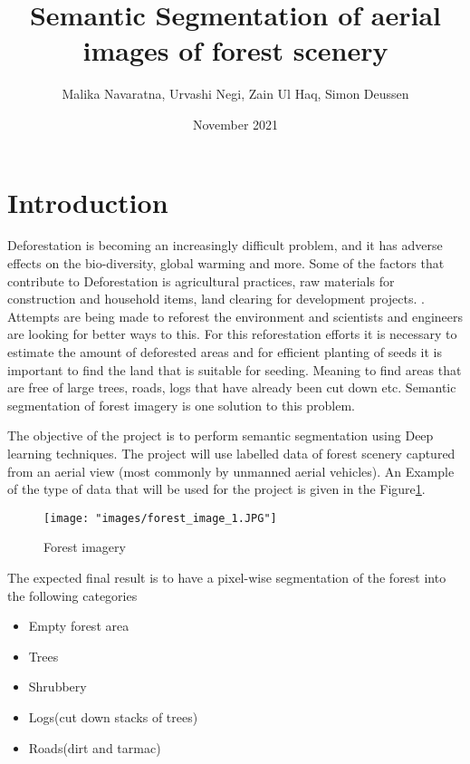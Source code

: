 \documentclass[rnd]{mas_proposal}
\title{Semantic Segmentation of aerial images of forest scenery}
\author{Malika Navaratna, Urvashi Negi, Zain Ul Haq, Simon Deussen}
\date{November 2021}
\begin{document}
\maketitle

\pagestyle{plain}

\section{Introduction}
    Deforestation is becoming an increasingly difficult problem, and it has adverse effects on the bio-diversity, global warming and more. 
    Some of the factors that contribute to Deforestation is agricultural practices, raw materials for construction and household items,
    land clearing for development projects. \cite{Kamilaris2018}. Attempts are being made to reforest the environment and scientists and engineers
    are looking for better ways to this. For this reforestation efforts it is necessary to estimate the 
    amount of deforested areas and for efficient planting of seeds it is important to find the land that is suitable for
    seeding. Meaning to find areas that are free of large trees, roads, logs that have already been cut down etc. Semantic segmentation
    of forest imagery is one solution to this problem. 
    \linebreak

    The objective of the project is to perform semantic segmentation using Deep learning techniques. The project will use
    labelled data of forest scenery captured from an aerial view (most commonly by unmanned aerial vehicles). An Example of the
    type of data that will be used for the project is given in the Figure\ref{fig:Example image}. 
    \begin{figure}[h!]
        \centering
        \texttt{[image: "images/forest\_image\_1.JPG"]}
        \caption{Forest imagery}
        \label{fig:Example image}
        \end{figure} 
    \linebreak
    The expected final result is to have a pixel-wise segmentation of the forest into the following categories    
        \begin{itemize}
            \item Empty forest area
            \item Trees
            \item Shrubbery
            \item Logs(cut down stacks of trees)
            \item Roads(dirt and tarmac)
        \end{itemize}
\end{document}

